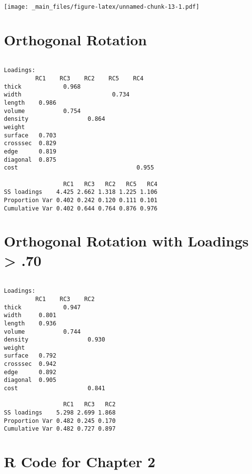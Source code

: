 \documentclass[
]{book}
\begin{document}
\texttt{[image: \_main\_files/figure-latex/unnamed-chunk-13-1.pdf]}

\hypertarget{orthogonal-rotation-1}{%
\section{Orthogonal Rotation}\label{orthogonal-rotation-1}}

\footnotesize

\begin{verbatim}

Loadings:
         RC1    RC3    RC2    RC5    RC4   
thick            0.968                     
width                          0.734       
length    0.986                            
volume           0.754                     
density                 0.864              
weight                                     
surface   0.703                            
crosssec  0.829                            
edge      0.819                            
diagonal  0.875                            
cost                                  0.955

                 RC1   RC3   RC2   RC5   RC4
SS loadings    4.425 2.662 1.318 1.225 1.106
Proportion Var 0.402 0.242 0.120 0.111 0.101
Cumulative Var 0.402 0.644 0.764 0.876 0.976
\end{verbatim}

\hypertarget{orthogonal-rotation-with-loadings-.70}{%
\section{Orthogonal Rotation with Loadings \textgreater{} .70}\label{orthogonal-rotation-with-loadings-.70}}

\footnotesize

\begin{verbatim}

Loadings:
         RC1    RC3    RC2   
thick            0.947       
width     0.801              
length    0.936              
volume           0.744       
density                 0.930
weight                       
surface   0.792              
crosssec  0.942              
edge      0.892              
diagonal  0.905              
cost                    0.841

                 RC1   RC3   RC2
SS loadings    5.298 2.699 1.868
Proportion Var 0.482 0.245 0.170
Cumulative Var 0.482 0.727 0.897
\end{verbatim}

\hypertarget{r-code-for-chapter-2}{%
\section{R Code for Chapter 2}\label{r-code-for-chapter-2}}
\end{document}
